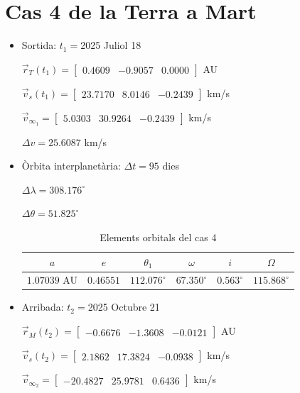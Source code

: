 \section{Cas 4 de la Terra a Mart}
\begin{itemize}
	\item Sortida: $t_{1}=$2025 Juliol 18

$\vec{r}_{T}(t_{1})=\begin{bmatrix}0.4609 & -0.9057 & 0.0000\end{bmatrix}$ AU

$\vec{v}_{s}(t_{1})=\begin{bmatrix}23.7170 & 8.0146 & -0.2439\end{bmatrix}$ km/s

$\vec{v}_{\infty_{1}}= \begin{bmatrix}5.0303 & 30.9264 & -0.2439\end{bmatrix}$ km/s

$\Delta v=25.6087$ km/s

	\item Òrbita interplanetària: $\Delta t=95$ dies

$\Delta\lambda=308.176^{\circ}$

$\Delta\theta=51.825^{\circ}$

\begin{table}[h!]
	\centering
	\begin{tabular}{ |c|c|c|c|c|c|}
		\hline
		$a$ & $e$ & $\theta_{1}$ & $\omega$ & $i$ & $\Omega$ \\ \hline
		$1.07039$ AU  & $0.46551$ & $112.076^{\circ}$ & $67.350^{\circ}$ & $0.563^{\circ}$ & $115.868^{\circ}$ \\ \hline
	\end{tabular}
	\caption{Elements orbitals del cas 4}
\end{table}
	\item Arribada: $t_{2}=$2025 Octubre 21

$\vec{r}_{M}(t_{2})=\begin{bmatrix}-0.6676 & -1.3608 & -0.0121\end{bmatrix}$ AU

$\vec{v}_{s}(t_{2})=\begin{bmatrix}2.1862 & 17.3824 & -0.0938\end{bmatrix}$ km/s


$\vec{v}_{\infty_{2}}=\begin{bmatrix}-20.4827 & 25.9781 & 0.6436\end{bmatrix}$ km/s
\end{itemize}
\pagebreak


